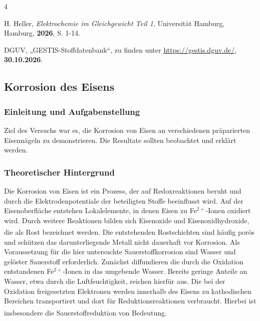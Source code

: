 \documentclass[
	a4paper,										%
	12pt,											%
	twoside,										%
	headsepline,								%
	footsepline,									%
	captions=tableheading,					%
]{scrartcl}
\newcommand{\zitat}[1]{\textsuperscript{\cite{#1}}}
\begin{document}
\begin{thebibliography}{4}		%

						{H. Heller}, 
			\textit	{Elektrochemie im Gleichgewicht Teil 1}, 
						{Universität Hamburg}, 
						{Hamburg}, 
			\textbf	{2026}, 
			S.			{1-14}.
	
						{DGUV}, 
						„{GESTIS-Stoffdatenbank}“, zu finden unter 
			\url		{https://gestis.dguv.de/}, 
			\textbf	{30.10.2026}.


\end{thebibliography}

\newpage

\setcounter{subsection}{2}							%
\setcounter{secnumdepth}{4}
	
\subsection{Korrosion des Eisens}

\subsubsection{Einleitung und Aufgabenstellung}
Ziel des Versuchs war es, die Korrosion von Eisen an verschiedenen präparierten Eisennägeln zu demonstrieren. Die Resultate sollten beobachtet und erklärt werden.

\subsubsection{Theoretischer Hintergrund}

Die Korrosion von Eisen ist ein Prozess,
der auf Redoxreaktionen beruht und durch die Elektrodenpotentiale der beteiligten Stoffe beeinflusst wird. Auf der Eisenoberfläche entstehen Lokalelemente,
in denen Eisen zu Fe$^{2+}$-Ionen oxidiert wird.
Durch weitere Reaktionen bilden sich Eisenoxide und Eisenoxidhydroxide, die als Rost bezeichnet werden.\zitat{eins}
Die entstehenden Rostschichten sind häufig porös und schützen das darunterliegende Metall nicht dauerhaft vor Korrosion. 
Als Voraussetzung für die hier untersuchte Sauerstoffkorrosion sind Wasser und gelöster Sauerstoff erforderlich.
Zunächst diffundieren die durch die Oxidation entstandenen Fe$^{2+}$-Ionen in das umgebende Wasser. Bereits geringe Anteile an Wasser,
etwa durch die Luftfeuchtigkeit, reichen hierfür aus.
Die bei der Oxidation freigesetzten Elektronen werden innerhalb des Eisens zu kathodischen Bereichen transportiert und dort für Reduktionsreaktionen verbraucht.
Hierbei ist insbesondere die Sauerstoffreduktion von Bedeutung.\zitat{zwei}
\end{document}
